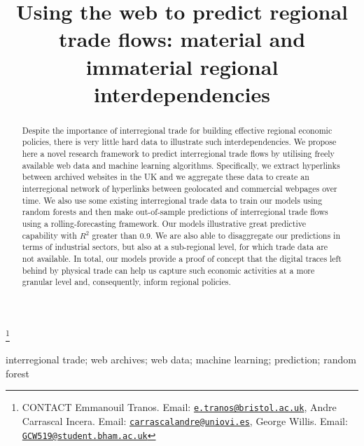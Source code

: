 \documentclass[]{interact}
\theoremstyle{plain}%
\theoremstyle{definition}
\theoremstyle{remark}
\begin{document}
\articletype{}

\title{Using the web to predict regional trade flows: material and
immaterial regional interdependencies}


\author{
}

\thanks{CONTACT Emmanouil
Tranos. Email: \href{mailto:e.tranos@bristol.ac.uk}{\nolinkurl{e.tranos@bristol.ac.uk}}, Andre
Carrascal
Incera. Email: \href{mailto:carrascalandre@uniovi.es}{\nolinkurl{carrascalandre@uniovi.es}}, George
Willis. Email: \href{mailto:GCW519@student.bham.ac.uk}{\nolinkurl{GCW519@student.bham.ac.uk}}}

\maketitle

\begin{abstract}
Despite the importance of interregional trade for building effective
regional economic policies, there is very little hard data to illustrate
such interdependencies. We propose here a novel research framework to
predict interregional trade flows by utilising freely available web data
and machine learning algorithms. Specifically, we extract hyperlinks
between archived websites in the UK and we aggregate these data to
create an interregional network of hyperlinks between geolocated and
commercial webpages over time. We also use some existing interregional
trade data to train our models using random forests and then make
out-of-sample predictions of interregional trade flows using a
rolling-forecasting framework. Our models illustrative great predictive
capability with \(R^2\) greater than 0.9. We are also able to
disaggregate our predictions in terms of industrial sectors, but also at
a sub-regional level, for which trade data are not available. In total,
our models provide a proof of concept that the digital traces left
behind by physical trade can help us capture such economic activities at
a more granular level and, consequently, inform regional policies.
\end{abstract}

\begin{keywords}
interregional trade; web archives; web data; machine learning;
prediction; random forest
\end{keywords}
\end{document}
